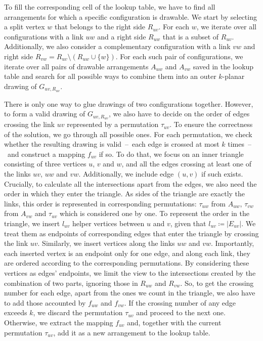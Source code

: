 To fill the corresponding cell of the lookup table, we have to find all arrangements for which a specific configuration is drawable. We start by selecting a split vertex \(w\) that belongs to the right side \(R_{uv}\). For each \(w\), we iterate over all configurations with a link \(uw\) and a right side \(R_{uw}\) that is a subset of \(R_{uv}\). Additionally, we also consider a complementary configuration with a link \(vw\) and right side \(R_{vw} = R_{uv} \setminus (R_{uw} \cup \{w\})\). For each such pair of configurations, we iterate over all pairs of drawable arrangements \(A_{uw}\) and \(A_{vw}\) saved in the lookup table and search for all possible ways to combine them into an outer \(k\)-planar drawing of \(G_{uv, R_{uv}}\).

There is only one way to glue drawings of two configurations together. However, to form a valid drawing of \(G_{uv, R_{uv}}\), we also have to decide on the order of edges crossing the link \(uv\) represented by a permutation \(\tau_{uv}\). To ensure the correctness of the solution, we go through all possible ones. For each permutation, we check whether the resulting drawing is valid~--~each edge is crossed at most \(k\) times~--~and construct a mapping \(f_{uv}\) if so. To do that, we focus on an inner triangle consisting of three vertices \(u\), \(v\) and \(w\), and all the edges crossing at least one of the links \(uv\), \(uw\) and \(vw\). Additionally, we include edge \((u, v)\) if such exists. Crucially, to calculate all the intersections apart from the edges, we also need the order in which they enter the triangle. As sides of the triangle are exactly the links, this order is represented in corresponding permutations: \(\tau_{uw}\) from \(A_{uw}\), \(\tau_{vw}\) from \(A_{vw}\) and \(\tau_{uv}\) which is considered one by one. To represent the order in the triangle, we insert \(l_{uv}\) helper vertices between \(u\) and \(v\), given that \(l_{uv}\coloneq|E_{uv}|\). We treat them as endpoints of corresponding edges that enter the triangle by crossing the link \(uv\). Similarly, we insert vertices along the links \(uw\) and \(vw\). Importantly, each inserted vertex is an endpoint only for one edge, and along each link, they are ordered according to the corresponding permutations. By considering these vertices as edges' endpoints, we limit the view to the intersections created by the combination of two parts, ignoring those in \(R_{uw}\) and \(R_{vw}\). So, to get the crossing number for each edge, apart from the ones we count in the triangle, we also have to add those accounted by \(f_{uw}\) and \(f_{vw}\). If the crossing number of any edge exceeds \(k\), we discard the permutation \(\tau_{uv}\) and proceed to the next one. Otherwise, we extract the mapping \(f_{uv}\) and, together with the current permutation \(\tau_{uv}\), add it as a new arrangement to the lookup table.

